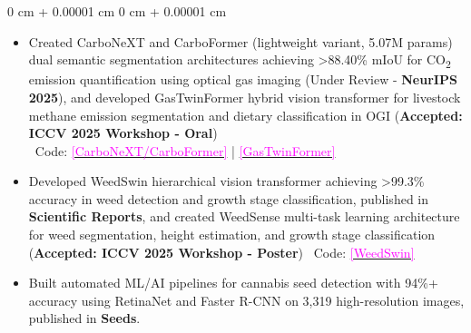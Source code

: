 \documentclass[10pt, letterpaper]{article}
\newenvironment{highlights}{
    \begin{itemize}[
        topsep=0.10 cm,
        parsep=0.10 cm,
        partopsep=0pt,
        itemsep=0pt,
        leftmargin=0 cm + 10pt
    ]
}{
    \end{itemize}
} %
\newenvironment{onecolentry}{
    \begin{adjustwidth}{
        0 cm + 0.00001 cm
    }{
        0 cm + 0.00001 cm
    }
}{
    \end{adjustwidth}
} %
\begin{document}
        \vspace{0.10 cm}
        \begin{onecolentry}


\begin{highlights}
    \item Created CarboNeXT and CarboFormer (lightweight variant, 5.07M params) dual semantic segmentation architectures achieving >88.40\% mIoU for CO\textsubscript{2} emission quantification using optical gas imaging (Under Review - \textbf{NeurIPS 2025}), and developed GasTwinFormer hybrid vision transformer for livestock methane emission segmentation and dietary classification in OGI (\textbf{Accepted: ICCV 2025 Workshop - Oral}) 
    \\{\small \faGithub\ Code: \href{https://github.com/taminulislam/carbonext-carboformer}{\textcolor{magenta}{[CarboNeXT/CarboFormer]}} | \href{https://github.com/toqitahamid/controlled-diet-methane-dataset-tools}{\textcolor{magenta}{[GasTwinFormer]}}}
    
    \item Developed WeedSwin hierarchical vision transformer achieving >99.3\% accuracy in weed detection and growth stage classification, published in \textbf{Scientific Reports}, and created WeedSense multi-task learning architecture for weed segmentation, height estimation, and growth stage classification (\textbf{Accepted: ICCV 2025 Workshop - Poster}) {\small \faGithub\ Code: \href{https://github.com/taminulislam/weedswin}{\textcolor{magenta}{[WeedSwin]}}}
    
    \item Built automated ML/AI pipelines for cannabis seed detection with 94\%+ accuracy using RetinaNet and Faster R-CNN on 3,319 high-resolution images, published in \textbf{Seeds}.
\end{highlights}

        \end{onecolentry}
\end{document}
